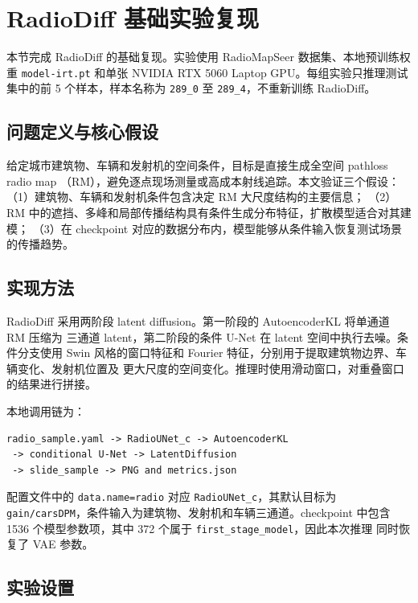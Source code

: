 
\section{RadioDiff 基础实验复现}
\label{sec:radiodiff-reproduction}

本节完成 RadioDiff 的基础复现。实验使用 RadioMapSeer 数据集、本地预训练权重
\texttt{model-irt.pt} 和单张 NVIDIA RTX 5060 Laptop GPU。每组实验只推理测试集中的前
5 个样本，样本名称为 \texttt{289\_0} 至 \texttt{289\_4}，不重新训练 RadioDiff。

\subsection{问题定义与核心假设}

给定城市建筑物、车辆和发射机的空间条件，目标是直接生成全空间 pathloss radio map
（RM），避免逐点现场测量或高成本射线追踪。本文验证三个假设：
（1）建筑物、车辆和发射机条件包含决定 RM 大尺度结构的主要信息；
（2）RM 中的遮挡、多峰和局部传播结构具有条件生成分布特征，扩散模型适合对其建模；
（3）在 checkpoint 对应的数据分布内，模型能够从条件输入恢复测试场景的传播趋势。

\subsection{实现方法}

RadioDiff 采用两阶段 latent diffusion。第一阶段的 AutoencoderKL 将单通道 RM 压缩为
三通道 latent，第二阶段的条件 U-Net 在 latent 空间中执行去噪。条件分支使用 Swin
风格的窗口特征和 Fourier 特征，分别用于提取建筑物边界、车辆变化、发射机位置及
更大尺度的空间变化。推理时使用滑动窗口，对重叠窗口的结果进行拼接。

本地调用链为：
\begin{verbatim}
radio_sample.yaml -> RadioUNet_c -> AutoencoderKL
 -> conditional U-Net -> LatentDiffusion
 -> slide_sample -> PNG and metrics.json
\end{verbatim}

配置文件中的 \texttt{data.name=radio} 对应 \texttt{RadioUNet\_c}，其默认目标为
\texttt{gain/carsDPM}，条件输入为建筑物、发射机和车辆三通道。checkpoint 中包含
1536 个模型参数项，其中 372 个属于 \texttt{first\_stage\_model}，因此本次推理
同时恢复了 VAE 参数。

\subsection{实验设置}

